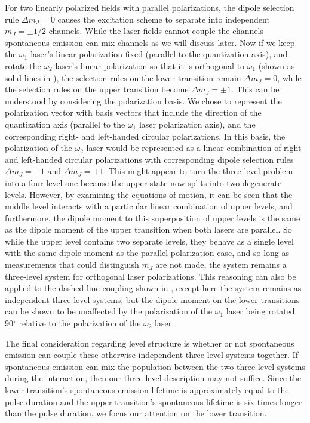 For two linearly polarized fields with parallel polarizations, the
dipole selection rule $\Delta m_J =0$ causes the excitation
scheme to separate into independent $m_J=\pm1/2$ channels.  While the laser
fields cannot couple the channels spontaneous emission can mix channels
as we will discuss later.  Now if we keep the $\omega_1$ laser's linear
polarization fixed (parallel to the quantization axis), and rotate the
$\omega_2$ laser's linear polarization so that it is orthogonal to
$\omega_1$ (shown as solid lines in ), the selection rules
on the lower transition remain $\Delta m_J =0$, while the selection rules
on the upper transition become $\Delta m_J = \pm 1$.  This can be understood by
considering the polarization basis.  We chose to represent the polarization
vector with basis vectors that include the direction of the quantization axis
(parallel to the $\omega_1$ laser polarization axis), and the corresponding
right- and left-handed circular polarizations.  In this basis, the polarization
of the $\omega_2$ laser would be represented as a linear combination of right-
and left-handed circular polarizations with corresponding dipole selection rules
$\Delta m_J = -1$ and $\Delta m_J = + 1$.  This might appear to turn the
three-level problem into a four-level one because the upper state now splits
into two degenerate levels.  However, by examining the equations of motion, it
can be seen that the middle level interacts with a particular linear combination
of upper levels, and furthermore, the dipole moment to this superposition of
upper levels is the same as the dipole moment of the upper transition when both
lasers are parallel.  So while the upper level contains two separate levels,
they behave as a single level with the same dipole moment as the parallel
polarization case, and so long as measurements that could distinguish
$m_J$ are not made, the system remains a three-level system for orthogonal laser
polarizations.  This reasoning can also be applied to the dashed line coupling
shown in , except here the system remains as independent
three-level systems, but the dipole moment on the lower transitions can be
shown to be unaffected by the polarization of the $\omega_1$ laser being
rotated 90$^{\circ}$ relative to the polarization of the $\omega_2$ laser.

The final consideration regarding level structure is whether or not spontaneous
emission can couple these otherwise independent three-level systems together. 
If spontaneous emission can mix the population between
the two three-level systems during the interaction, then our three-level
description may not suffice.  Since the lower transition's spontaneous emission
lifetime is approximately equal to the pulse duration and the upper transition's
spontaneous lifetime is six times longer than the pulse duration, we focus our
attention on the lower transition.

